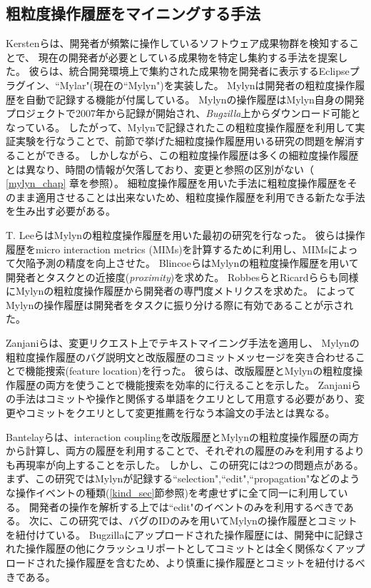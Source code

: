 \documentclass[a4paper]{jsbook}
\begin{document}
\subsection{粗粒度操作履歴をマイニングする手法}
Kerstenらは、開発者が頻繁に操作しているソフトウェア成果物群を検知することで、
現在の開発者が必要としている成果物を特定し集約する手法を提案した。
彼らは、統合開発環境上で集約された成果物を開発者に表示するEclipseプラグイン、``Mylar"(現在の``Mylyn")\cite{Kersten:2005}を実装した。
Mylynは開発者の粗粒度操作履歴を自動で記録する機能が付属している。
Mylynの操作履歴はMylyn自身の開発プロジェクトで2007年から記録が開始され、{\it Bugzilla}上からダウンロード可能となっている。
したがって、Mylynで記録されたこの粗粒度操作履歴を利用して実証実験を行なうことで、前節で挙げた細粒度操作履歴用いる研究の問題を解消することができる。
しかしながら、この粗粒度操作履歴は多くの細粒度操作履歴とは異なり、時間の情報が欠落しており、変更と参照の区別がない（ \ref{mylyn_chap} 章を参照）。
細粒度操作履歴を用いた手法に粗粒度操作履歴をそのまま適用させることは出来ないため、粗粒度操作履歴を利用できる新たな手法を生み出す必要がある。

T. Leeら\cite{TLee:2011}はMylynの粗粒度操作履歴を用いた最初の研究を行なった。
彼らは操作履歴をmicro interaction metrics (MIMs)を計算するために利用し、MIMsによって欠陥予測の精度を向上させた。
Blincoeら\cite{Blincoe:2012}はMylynの粗粒度操作履歴を用いて開発者とタスクとの近接度({\it proximity})を求めた。
Robbesら\cite{Robbes:2013}とRicardら\cite{Silva:2015}らも同様にMylynの粗粒度操作履歴から開発者の専門度メトリクスを求めた。
\cite{Blincoe:2012,Robbes:2013,Silva:2015}によってMylynの操作履歴は開発者をタスクに振り分ける際に有効であることが示された。

Zanjaniら\cite{Zanjani:2014}は、変更リクエスト上でテキストマイニング手法を適用し、
Mylynの粗粒度操作履歴のバグ説明文と改版履歴のコミットメッセージを突き合わせることで機能捜索(feature location)を行った。
彼らは、改版履歴とMylynの粗粒度操作履歴の両方を使うことで機能捜索を効率的に行えることを示した。
Zanjaniらの手法はコミットや操作と関係する単語をクエリとして用意する必要があり、変更やコミットをクエリとして変更推薦を行なう本論文の手法とは異なる。

Bantelayら\cite{Bantelay:2013}は、interaction couplingを改版履歴とMylynの粗粒度操作履歴の両方から計算し、両方の履歴を利用することで、それぞれの履歴のみを利用するよりも再現率が向上することを示した。
しかし、この研究には2つの問題点がある。
まず、この研究ではMylynが記録する``selection",``edit",``propagation"などのような操作イベントの種類(\ref{kind_sec}節参照)を考慮せずに全て同一に利用している。
開発者の操作を解析する上では``edit"のイベントのみを利用するべきである。
次に、この研究では、バグのIDのみを用いてMylynの操作履歴とコミットを紐付けている。
Bugzillaにアップロードされた操作履歴には、開発中に記録された操作履歴の他にクラッシュリポートとしてコミットとは全く関係なくアップロードされた操作履歴を含むため、より慎重に操作履歴とコミットを紐付けるべきである。
\end{document}

